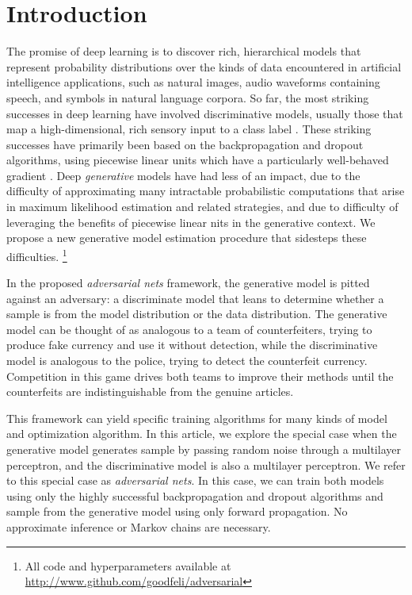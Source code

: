 \section{Introduction}
The promise of deep learning is to discover rich, hierarchical models \cite{2_MAL-006} that represent probability distributions over the kinds of data encountered in artificial intelligence applications, such as natural images, audio waveforms containing speech, and symbols in natural language corpora. So far, the most striking successes in deep learning have involved discriminative models, usually those that map a high-dimensional, rich sensory input to a class label \cite{14_6296526, 22_NIPS2012_c399862d}. These striking successes have primarily been based on the backpropagation and dropout algorithms, using piecewise linear units \cite{19_5459469,9_pmlr-v15-glorot11a,10_goodfellow2013maxoutnetworks} which have a particularly well-behaved gradient%
. Deep \emph{generative} models have had less of an impact, due to the difficulty of approximating many intractable probabilistic computations that arise in maximum likelihood estimation and related strategies, and due to difficulty of leveraging the benefits of piecewise linear nits in the generative context. We propose a new generative model estimation procedure that sidesteps these difficulties.%
\footnote{All code and hyperparameters available at \url{http://www.github.com/goodfeli/adversarial}}

\noindent In the proposed \emph{adversarial nets} framework, the generative model is pitted against an adversary: a discriminate model that leans to determine whether a sample is from the model distribution or the data distribution. The generative model can be thought of as analogous to a team of counterfeiters, trying to produce fake currency and use it without detection, while the discriminative model is analogous to the police, trying to detect the counterfeit currency. Competition in this game drives both teams to improve their methods until the counterfeits are indistinguishable %
from the genuine articles.

\noindent This framework can yield specific training algorithms for many kinds of model and optimization algorithm. In this article, we explore the special case when the generative model generates sample by passing random noise through a multilayer perceptron, and the discriminative model is also a multilayer perceptron. We refer to this special case as \emph{adversarial nets}. In this case, we can train both models using only the highly successful backpropagation and dropout algorithms \cite{17_hinton2012improvingneuralnetworkspreventing} and sample from the generative model using only forward propagation. No approximate inference or Markov chains are necessary.
